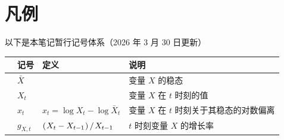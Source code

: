 \cleardoublepage
\pagestyle{symplain}
\thispagestyle{symplain}
\chapter*{凡例}
\vspace{\baselineskip}

以下是本笔记暂行记号体系（2026 年 3 月 30 日更新）

\begin{table}[htbp]
    \centering
    \renewcommand{\arraystretch}{1.4}
    \begin{tabular}{>{\arraybackslash}p{} >{\arraybackslash}p{} >{\arraybackslash}p{} >{\arraybackslash}p{}}
        \toprule
        & \textbf{记号} & \textbf{定义} & \textbf{说明} \\
        \midrule
        &\(\bar X\) & & 变量 \(X\) 的稳态\\
        &\(X_t\) & & 变量 \(X\) 在 \(t\) 时刻的值\\
        &\(\hat x_t\) & \(\hat x_t=\log X_t-\log \bar X_t\) & 变量 \(X\) 在 \(t\) 时刻关于其稳态的对数偏离\\
        \midrule
        &\(g_{X,t}\) & \(\bka{X_t-X\lt}/\,X\lt\) & \(t\) 时刻变量 \(X\) 的增长率\\
        \bottomrule
    \end{tabular}
    \renewcommand{\arraystretch}{0}
\end{table}


\clearpage
\pagestyle{symplain}
